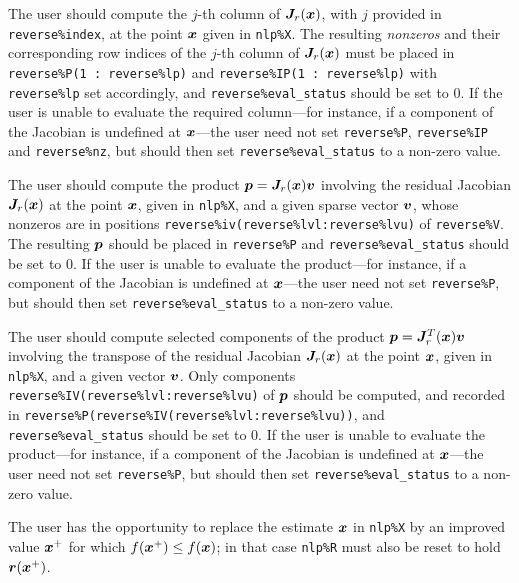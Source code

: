 \documentclass{galahad}
\begin{document}
\begin{description}
 The user should compute the $j$-th column of ${\bm{J}}_r({\bm{x}})$, with
     $j$ provided in {\tt reverse\%index}, at the point ${\bm{x}}$ given in 
     {\tt nlp\%X}. The resulting {\em nonzeros} and their corresponding 
     row indices of the $j$-th column of ${\bm{J}}_r({\bm{x}})$ must be placed in 
     {\tt reverse\%P(1 : reverse\%lp)} and 
     {\tt reverse\%IP(1 : reverse\%lp)} with {\tt reverse\%lp} set accordingly,
     and {\tt reverse\%eval\_status} should be set to 0. If the user is
     unable to evaluate the required column---for instance, if a component of 
     the Jacobian is undefined at ${\bm{x}}$---the user need not set 
     {\tt reverse\%P}, {\tt reverse\%IP} and {\tt reverse\%nz},
     but should then set {\tt reverse\%eval\_status} to a non-zero value.

 The user should compute the product ${\bm{p}} = {\bm{J}}_r({\bm{x}}) {\bm{v}}$
     involving the residual Jacobian ${\bm{J}}_r({\bm{x}})$ at the point ${\bm{x}}$, given
     in {\tt nlp\%X}, and a given sparse vector ${\bm{v}}$, whose nonzeros
     are in positions {\tt reverse\%iv(reverse\%lvl:reverse\%lvu)}
     of {\tt reverse\%V}. The resulting ${\bm{p}}$ should be placed in 
     {\tt reverse\%P} and {\tt reverse\%eval\_status} should be set to 0. 
     If the user is unable to evaluate the product---for instance, if a 
     component of the Jacobian is undefined at ${\bm{x}}$---the user need not 
     set {\tt reverse\%P}, but should then set {\tt reverse\%eval\_status} 
     to a non-zero value.

 The user should compute selected components of the product 
     ${\bm{p}} = {\bm{J}}_r^T({\bm{x}}) {\bm{v}}$ involving the transpose of the residual 
     Jacobian ${\bm{J}}_r({\bm{x}})$ at the point ${\bm{x}}$, given
     in {\tt nlp\%X}, and a given vector ${\bm{v}}$. Only components \linebreak
     {\tt reverse\%IV(reverse\%lvl:reverse\%lvu)} of ${\bm{p}}$ should
     be computed, and recorded in \linebreak
     {\tt reverse\%P(reverse\%IV(reverse\%lvl:reverse\%lvu))}, and
     {\tt reverse\%eval\_status} should be set to 0. 
     If the user is unable to evaluate the product---for instance, if a 
     component of the Jacobian is undefined at ${\bm{x}}$---the user need not 
     set {\tt reverse\%P}, but should then set {\tt reverse\%eval\_status} 
     to a non-zero value.

 The user has the opportunity to replace the estimate ${\bm{x}}$ in 
     {\tt nlp\%X} by an improved value ${\bm{x}}^+$ for which 
     $f({\bm{x}}^+) \leq f({\bm{x}})$; in that case {\tt nlp\%R} must also be reset to
     hold ${\bm{r}}({\bm{x}}^+)$.

\end{description}
\end{document}
